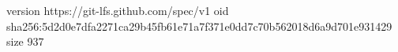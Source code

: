 version https://git-lfs.github.com/spec/v1
oid sha256:5d2d0e7dfa2271ca29b45fb61e71a7f371e0dd7c70b562018d6a9d701e931429
size 937
